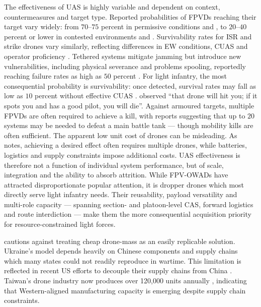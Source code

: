 The effectiveness of UAS is highly variable and dependent on context, countermeasures and target type. Reported probabilities of FPVDs reaching their target vary widely: from $70$--$75$ percent in permissive conditions \parencite{dan_participant_1} and \parencite[18:15--18:50]{Bespalov_2026}, to $20$--$40$ percent or lower in contested environments \parencite[10]{WATLING_2025B} and \parencite[27]{BRONK_2024}. Survivability rates for ISR and strike drones vary similarly, reflecting differences in EW conditions, CUAS and operator proficiency \parencite{BRONK_2024,ZABRODSKYI_2022}. Tethered systems mitigate jamming but introduce new vulnerabilities, including physical severance and problems spooling, reportedly reaching failure rates as high as $50$ percent \parencite[23:50--24:05]{Ingvald_1}. For light infantry, the most consequential probability is survivability: once detected, survival rates may fall as low as $10$ percent without effective CUAS \parencite[13:17--17:50]{zandar_2025}. \textcite[2:55--4:19]{Gifford_m_2025325} observed ``that drone will hit you; if it spots you and has a good pilot, you will die''. Against armoured targets, multiple FPVDs are often required to achieve a kill, with reports suggesting that up to $20$ systems may be needed to defeat a main battle tank \parencite{BRONK_2024,stu_lyle_participant_11,watling_2025_10} --- though mobility kills are often sufficient.
The apparent low unit cost of drones can be misleading. As \textcite[25]{MOLLOY_2024} notes, achieving a desired effect often requires multiple drones, while batteries, logistics and supply constraints impose additional costs. UAS effectiveness is therefore not a function of individual system performance, but of scale, integration and the ability to absorb attrition. While FPV-OWADs have attracted disproportionate popular attention, it is dropper drones which most directly serve light infantry needs. Their reusability, payload versatility and multi-role capacity --- spanning section- and platoon-level CAS, forward logistics and route interdiction --- make them the more consequential acquisition priority for resource-constrained light forces.

\textcite{tollast_2025_11} cautions against treating cheap drone-mass as an easily replicable solution. Ukraine's model depends heavily on Chinese components and supply chains which many states could not readily reproduce in wartime. This limitation is reflected in recent US efforts to decouple their supply chains from China \parencite{us_house_2025_ccp_legislation}. Taiwan’s drone industry now produces over 120,000 units annually \parencite{economist_taiwan}, indicating that Western-aligned manufacturing capacity is emerging despite supply chain constraints.

